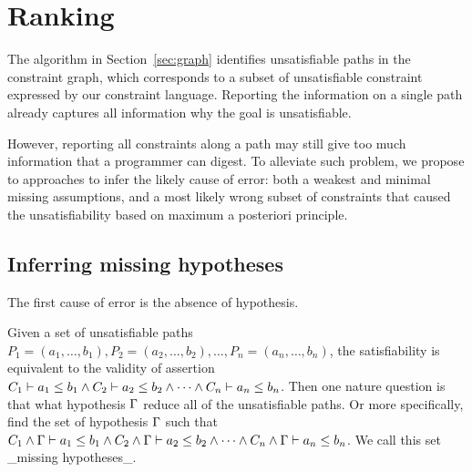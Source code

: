 % 
% 
% 
% 
% 
% 
\section{Ranking}
\label{sec:ranking}

The algorithm in Section~\ref{sec:graph} identifies unsatisfiable paths in the
constraint graph, which corresponds to a subset of unsatisfiable constraint
expressed by our constraint language. Reporting the information on a single
path already captures all information why the goal is unsatisfiable.

However, reporting all constraints along a path may still give too much
information that a programmer can digest. To alleviate such problem, we propose
to approaches to infer the likely cause of error: both a weakest and minimal
missing assumptions, and a most likely wrong subset of constraints that caused
the unsatisfiability based on maximum a posteriori principle.
 

\subsection{Inferring missing hypotheses}
\label{sec:assumptions}

The first cause of error is the absence of hypothesis.

Given a set of unsatisfiable paths $P_1 = (a_1, \dots, b_1), P_2 = (a_2, \dots,
b_2), \dots,  P_n = (a_n, \dots, b_n)$, the satisfiability is
equivalent to the validity of assertion $C_1 \vdash a_1 \leq b_1
\land C_2 \vdash a_2 \leq b_2 \land \dots \land C_n \vdash a_n \leq
b_n$. Then one nature question is that what hypothesis $\Gamma$ reduce all
of the unsatisfiable paths. Or more specifically, find the set of
hypothesis $\Gamma$ such that 
%
$C_1 \land \Gamma \vdash a_1 \leq b_1 \land C_2 \land \Gamma \vdash a_2 \leq
b_2 \land \dots \land C_n \land \Gamma \vdash a_n \leq b_n$. 
%
We call this set _missing hypotheses_.

